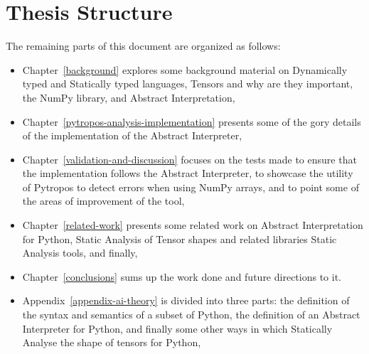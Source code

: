 \section{Thesis Structure}\label{thesis-structure}

The remaining parts of this document are organized as follows:

\begin{itemize}
\tightlist
\item
  Chapter~\ref{background} explores some background material on
  Dynamically typed and Statically typed languages, Tensors and why are
  they important, the NumPy library, and Abstract Interpretation,
\item
  Chapter~\ref{pytropos-analysis-implementation} presents some of the
  gory details of the implementation of the Abstract Interpreter,
\item
  Chapter~\ref{validation-and-discussion} focuses on the tests made to
  ensure that the implementation follows the Abstract Interpreter, to
  showcase the utility of Pytropos to detect errors when using NumPy
  arrays, and to point some of the areas of improvement of the tool,
\item
  Chapter~\ref{related-work} presents some related work on Abstract
  Interpretation for Python, Static Analysis of Tensor shapes and
  related libraries Static Analysis tools, and finally,
\item
  Chapter~\ref{conclusions} sums up the work done and future directions
  to it.
\item
  Appendix~\ref{appendix-ai-theory}
  is divided into three parts: the definition of the syntax and
  semantics of a subset of Python, the definition of an Abstract
  Interpreter for Python, and finally some other ways in which
  Statically Analyse the shape of tensors for Python,
\end{itemize}
